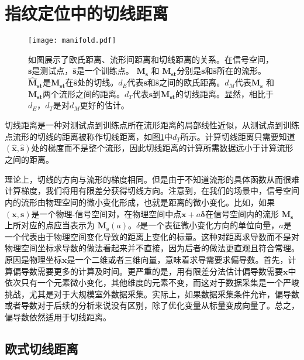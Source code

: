 \section{指纹定位中的切线距离}

\begin{figure}
	\centering
	\texttt{[image: manifold.pdf]}
	\caption{如图展示了欧氏距离、流形间距离和切线距离的关系。在信号空间，$\mathbf{s}$是测试点，$\widehat{\mathbf{s}}$是一个训练点。 $\boldsymbol{M_s}$ 和 $\boldsymbol{M_{st}}$分别是$\mathbf{s}$和$\widehat{\mathbf{s}}$所在的流形。$\boldsymbol{\widehat{M}_{st}}$是$\boldsymbol{M_{st}}$在$\widehat{\mathbf{s}}$处的切线。$d_E$代表$\mathbf{s}$和$\widehat{\mathbf{s}}$之间的欧氏距离。$d_M$代表$\boldsymbol{M_s}$ 和 $\boldsymbol{M_{st}}$两个流形之间的距离。$d_T$代表$\mathbf{s}$到$\boldsymbol{M_{st}}$的切线距离。显然，相比于$d_E$，$d_T$是对$d_M$更好的估计。}
	\label{fig:manifold}
\end{figure}

切线距离是一种对测试点到训练点所在流形距离的局部线性近似，从测试点到训练点流形的切线的距离被称作切线距离，如图\ref{fig:manifold}中$d_T$所示。计算切线距离只需要知道$(\widehat{\mathbf{x}}, \widehat{\mathbf{s}})$处的梯度而不是整个流形，因此切线距离的计算所需数据远小于计算流形之间的距离。

理论上，切线的方向与流形的梯度相同。但是由于不知道流形的具体函数从而很难计算梯度，我们将用有限差分获得切线方向。注意到，在我们的场景中，信号空间内的流形由物理空间的微小变化形成，也就是距离的微小变化。比如，如果$(\mathbf{x}, \mathbf{s})$是一个物理-信号空间对，在物理空间中点$\mathbf{x} + a{\bm{\delta}}$在信号空间内的流形 $\boldsymbol{M_s}$上所对应的点应当表示为 $\boldsymbol{M_s}(a)$。$\delta$是一个表征微小变化方向的单位向量，$a$是一个代表由于物理空间变化导致的距离上变化的标量。这种对距离求导数而不是对物理空间坐标求导数的做法看起来并不直接，因为后者的做法更直观且符合常理。原因是物理坐标$\mathbf{x}$是一个二维或者三维向量，意味着求导需要求偏导数。首先，计算偏导数需要更多的计算及时间。更严重的是，用有限差分法估计偏导数需要$\mathbf{x}$中依次只有一个元素微小变化，其他维度的元素不变，而这对于数据采集是一个严峻挑战，尤其是对于大规模室外数据采集。实际上，如果数据采集条件允许，偏导数或者导数对于后续的分析来说没有区别，除了优化变量从标量变成向量了。总之，偏导数依然适用于切线距离。

\subsection{欧式切线距离}

